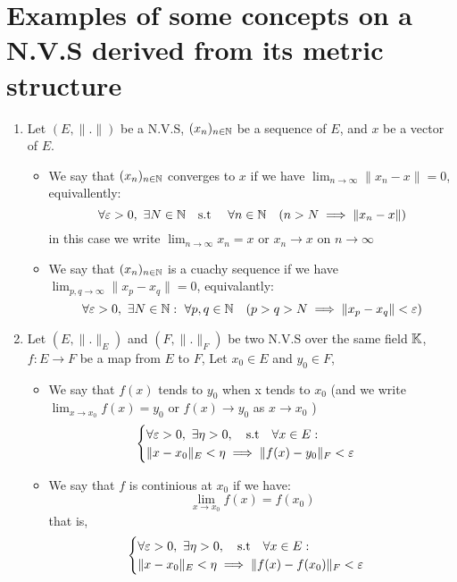 	\section{Examples of some concepts on a N.V.S derived from its metric structure}
	\begin{enumerate}                                                                                            
	\item Let $(E,\| . \| ) $ be a N.V.S, $(x_{n})_{n \in \mathbb{N}}$ be a sequence of $E$, and $x$ be a vector of $E$.
		\begin{itemize}
			\item We say that $(x_{n})_{n \in \mathbb{N}}$ converges to $x$ if we have $\lim_{n \to \infty} \| x_{n} -x \| =0$,
				equivallently:
				\[
					\forall \varepsilon > 0, ~\exists N \in \mathbb{N} \quad \text{s.t } \quad  \forall n \in \mathbb{N} \quad 
					(n>N \implies \| x_{n} -x \| )  
				\]
				in this case we write $\lim_{n \to \infty} x_{n}  = x$ or $x_{n} \rightarrow x$ on $n \rightarrow \infty$
			\item We say that $(x_{n})_{n \in \mathbb{N}}$ is a cuachy sequence if we have 
				$\lim_{p,q \to \infty} \| x_{p} - x_{q}\| = 0$, equivalantly:
				\[
					\forall \varepsilon > 0, ~\exists N \in \mathbb{N}: ~\forall p,q \in \mathbb{N} \quad 
					(p>q>N \implies \| x_{p} - x_{q}\| < \varepsilon  ) 
				\]	
		\end{itemize}
	\item Let $(E,\| . \|_{E} )$ and $(F,\| . \|_{F} )$ be two N.V.S over the same field $\mathbb{K}$, 
		$ f : E \longrightarrow F $ be a map from $E$ to $F$, Let $x_0 \in  E$ and $y_0 \in F$,
		\begin{itemize}
			\item We say that $f(x)$ tends to $y_{0}$ when x tends to $x_0$ (and we write $\lim_{x \to x_0} f(x) = y_0$ or
				$f(x) \rightarrow y_0$ as $x \rightarrow x_0$  )
				\[
				\begin{cases}
					\forall \varepsilon >0, ~\exists \eta >0, \quad \text{s.t} \quad \forall x \in E: \\
					\| x-x_0 \| _{E} < \eta \implies \| f(x) - y_0  \| _{F} < \varepsilon 
				\end{cases}
				\]
			\item We say that $f$ is continious at $x_0$ if we have:
				\[
					\lim_{x \to x_0} f(x) = f(x_0)  
				\]
			that is,
			\[
				\begin{cases}
					\forall \varepsilon >0, ~\exists \eta >0, \quad \text{s.t} \quad \forall x \in E: \\
					\| x-x_0 \| _{E} < \eta \implies \| f(x) - f(x_0)  \| _{F} < \varepsilon 

\end{cases}\]
\end{itemize}
\end{enumerate}

